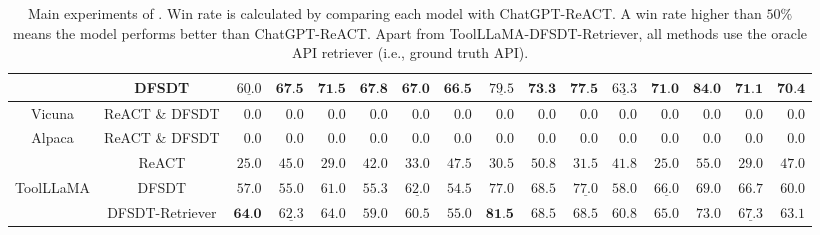 \begin{table}[!t]
{\begin{tabular}{cc|rr|rr|rr|rr|rr|rr|rr}
    & DFSDT & $\underline{60.0}$ & $\textbf{67.5}$ & $\textbf{71.5}$ & $\textbf{67.8}$ & $\textbf{67.0}$ & $\textbf{66.5}$ & $\underline{79.5}$ & $\textbf{73.3}$ & $\textbf{77.5}$ & $\underline{63.3}$ & $\textbf{71.0}$ & $\textbf{84.0}$ & $\textbf{71.1}$ & $\textbf{70.4}$  \\
    \midrule
    Vicuna & ReACT \& DFSDT & $0.0$ & 0.0 & $0.0$ & 0.0 & $0.0$ & 0.0 & $0.0$ & 0.0 & $0.0$ & 0.0 & $0.0$ & 0.0 & $0.0$ & 0.0  \\
    Alpaca & ReACT \& DFSDT & $0.0$ & 0.0 & $0.0$ & 0.0 & $0.0$ & 0.0 & $0.0$ & 0.0 & $0.0$ & 0.0 & $0.0$ & 0.0 & $0.0$ & 0.0  \\
     & ReACT & $25.0$ & $45.0$ & $29.0$ & $42.0$ & $33.0$ & $47.5$ & $30.5$ & $50.8$ & $31.5$ & $41.8$ & $25.0$ & $55.0$ & $29.0$ & $47.0$\\
    ToolLLaMA & DFSDT & $57.0$ & $55.0$ & $61.0$ & $55.3$ & $\underline{62.0}$ & $54.5$ & $77.0$ & $68.5$ & $\underline{77.0}$ & $58.0$ & $\underline{66.0}$ & $69.0$ & $66.7$ & $60.0$ \\
    & DFSDT-Retriever  & $\textbf{64.0}$ & $\underline{62.3}$ & $64.0$ & $59.0$ & $60.5$ & $55.0$ & $\textbf{81.5}$ & $68.5$ & $68.5$ & $60.8$ & $65.0$ & $73.0$ & $\underline{67.3}$ & $63.1$ \\
    
    \bottomrule
    \end{tabular}%
    }
    \caption{
    \small{Main experiments of \ourdata. Win rate is calculated by comparing each model with ChatGPT-ReACT. A win rate higher than $50\%$ means the model performs better than ChatGPT-ReACT. Apart from ToolLLaMA-DFSDT-Retriever, all methods use the oracle API retriever (i.e., ground truth API).
    }
    }
    \label{tab:main_exp}
    \end{table}


